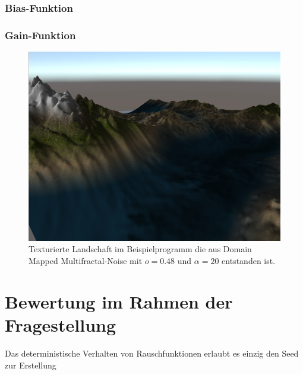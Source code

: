 \subsubsection{Bias-Funktion}

\subsubsection{Gain-Funktion}

\begin{figure}
	\centering
	\includegraphics[width=\textwidth]{images/domainwarped_rendered.png}
	\caption{Texturierte Landschaft im Beispielprogramm die aus Domain Mapped Multifractal-Noise mit $o=0.48$ und $\alpha=20$ entstanden ist.}\label{img.domainwarpedRendered}
\end{figure}


\section{Bewertung im Rahmen der Fragestellung}
Das deterministische Verhalten von Rauschfunktionen erlaubt es einzig den Seed zur Erstellung %









